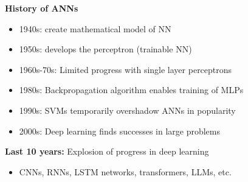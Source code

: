 \begin{frame}

    \textbf{History of ANNs}

    \begin{itemize}
        \item 1940s:  create mathematical model of NN
        \vspace{0.5em}
        \item 1950s:  develops the perceptron (trainable NN)
        \vspace{0.5em}
        \item 1960s-70s: Limited progress with single layer perceptrons
        \vspace{0.5em}
        \item 1980s: Backpropagation algorithm enables training of MLPs
        \vspace{0.5em}
        \item 1990s: SVMs temporarily overshadow ANNs in popularity
        \vspace{0.5em}
        \item 2000s: Deep learning finds successes in large problems
    \end{itemize}
    
        \vspace{0.5em}
        \vspace{0.5em}
    \textbf{Last 10 years:} Explosion of progress in deep learning 

    \begin{itemize}
        \item CNNs, RNNs, LSTM networks, transformers, LLMs, etc.
    \end{itemize}

\end{frame}



